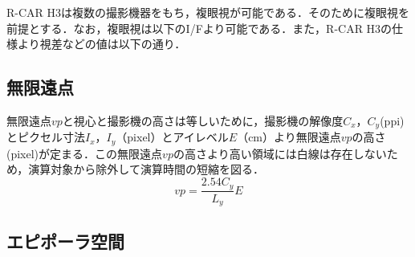 \documentclass{jsarticle}
\begin{document}
R-CAR H3は複数の撮影機器をもち，複眼視が可能である．そのために複眼視を前提とする．なお，複眼視は以下のI/Fより可能である．また，R-CAR H3の仕様より視差などの値は以下の通り．
\begin{center}
\end{center}

\subsection{無限遠点}
\label{無限遠点}

無限遠点$vp$と視心と撮影機の高さは等しいために，撮影機の解像度$C_x$，$C_y$(ppi)とピクセル寸法$I_x$，$I_y$（pixel）とアイレベル$E$（cm）より無限遠点$vp$の高さ(pixel)が定まる．この無限遠点$vp$の高さより高い領域には白線は存在しないため，演算対象から除外して演算時間の短縮を図る．
\[
vp=\frac{2.54 C_y}{L_y}E
\]

\subsection{エピポーラ空間}
\label{エピポーラ空間}
\end{document}
